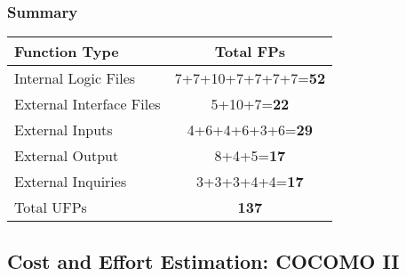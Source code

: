 \subsubsection{Summary}

\begin{center}
\begin{tabular}{ |l|c| }
\hline
\textbf{Function Type} & \textbf{Total FPs} \\
\hline
Internal Logic Files & 7+7+10+7+7+7+7=\textbf{52} \\
\hline
External Interface Files & 5+10+7=\textbf{22}\\
\hline
External Inputs & 4+6+4+6+3+6=\textbf{29} \\ 
\hline
External Output & 8+4+5=\textbf{17} \\
\hline
External Inquiries & 3+3+3+4+4=\textbf{17} \\
\hline
Total UFPs & \textbf{137}\\
\hline
\end{tabular}
\end{center}



\subsection{Cost and Effort Estimation: COCOMO II}
